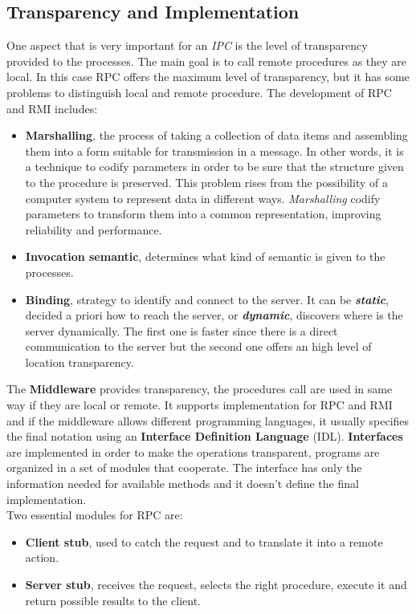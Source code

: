 \documentclass[11pt,a4paper]{article}
\begin{document}
\subsection{Transparency and Implementation}
One aspect that is very important for an \textit{IPC} is the level of transparency provided to the processes. The main goal is to call remote procedures as they are local. In this case RPC offers the maximum level of transparency, but it has some problems to distinguish local and remote procedure. The development of RPC and RMI includes:
\begin{itemize}
	\item \textbf{Marshalling},  the process of taking a collection of data items and assembling them into a form suitable for transmission in a message. In other words, it is a technique to codify parameters in order to be sure that the structure given to the procedure is preserved. This problem rises from the possibility of a computer system to represent data in different ways. \textit{Marshalling} codify parameters to transform them into a common representation, improving reliability and performance.
	\item \textbf{Invocation semantic}, determines what kind of semantic is given to the processes.
	\item \textbf{Binding}, strategy to identify and connect to the server. It can be \textit{\textbf{static}}, decided a priori how to reach the server, or \textit{\textbf{dynamic}}, discovers where is the server dynamically. The first one is faster since there is a direct communication to the server but the second one offers an high level of location transparency.
\end{itemize}

The \textbf{Middleware} provides transparency, the procedures call are used in same way if they are local or remote. It supports implementation for RPC and RMI and if the middleware allows different programming languages, it usually specifies the final notation using an \textbf{Interface Definition Language} (IDL).
\textbf{Interfaces} are implemented in order to make the operations transparent, programs are organized in a set of modules that cooperate. The interface has only the information needed for available methods and it doesn't define the final implementation.\\
Two essential modules for RPC are:
\begin{itemize}
	\item \textbf{Client stub}, used to catch the request and to translate it into a remote action.
	\item \textbf{Server stub}, receives the request, selects the right procedure, execute it and return possible results to the client.
\end{itemize}
\end{document}
